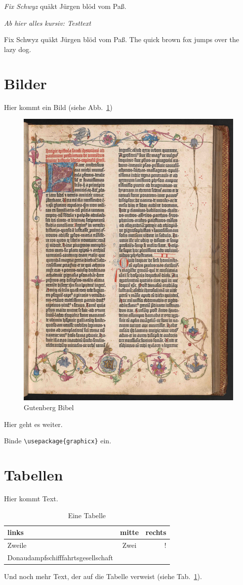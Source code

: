 \documentclass[a4paper]{article}
\begin{document}
\textit{Fix Schwyz} quäkt Jürgen blöd vom Paß.

\itshape
Ab hier alles kursiv: Testtext

Fix Schwyz quäkt Jürgen blöd vom Paß.
The quick brown fox jumps over the lazy dog.
\upshape

\section{Bilder}

Hier kommt ein Bild (siehe Abb.~\ref{im:Bibel})

\begin{figure}
\begin{center}
    \includegraphics[width=0.5\linewidth]{./res/gutenberg.jpg}
\caption{Gutenberg Bibel}
\label{im:Bibel}
\end{center}
\end{figure}

Hier geht es weiter.
\listoffigures

Binde \verb+\usepackage{graphicx}+ ein.

\section{Tabellen}
Hier kommt Text.
\begin{table}[tbp]
\begin{center}
\begin{tabular}{|p{2cm}|c r|}
\hline
links    &    mitte    &    rechts\\
\hline
Zweile   &    Zwei     &    !\\
Donau\-dampf\-schiff\-fahrts\-ge\-sell\-schaft&&\\
\hline
\hline
\end{tabular}
\caption{Eine Tabelle}
\label{tab:Tabelle}
\end{center}
\end{table}
Und noch mehr Text, der auf die Tabelle verweist (siehe Tab.~\ref{tab:Tabelle}).
\listoftables
\end{document}
